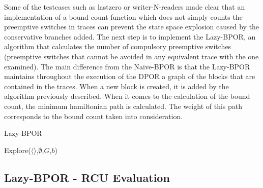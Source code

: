 Some of the testcases such as lastzero or writer-N-readers made clear that an implementation of a bound count function which does not simply counts the preemptive switches in traces can prevent
the state space explosion caused by the conservative branches added. The next step is to implement the Lazy-BPOR, an algorithm that calculates the number of compulsory
preemptive switches (preemptive switches that cannot be avoided in any equivalent trace with the one examined). The main difference from the Naive-BPOR is that
the Lazy-BPOR maintains throughout the execution of the DPOR a graph of the blocks that are contained in the traces. When a new block is created, it is added by the
algorithm previously described. When it comes to the calculation of the bound count, the minimum hamiltonian path is calculated. The weight of this path corresponds
to the bound count taken into consideration.

\begin{algorithm}
    \caption{Lazy-BPOR}
    \label{Lazy-BPOR}
    Explore($\langle \rangle$,$\emptyset$,$G$,$b$)\;
\end{algorithm}



\subsection{Lazy-BPOR - RCU Evaluation}

